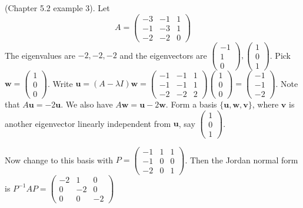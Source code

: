 \documentclass[a4paper]{article}
\begin{document}
      \begin{eg}
        (Chapter 5.2 example 3). Let
        \[
          A = \begin{pmatrix}
            -3 & -1 & 1\\
            -1 & -3 & 1\\
            -2 & -2 & 0
          \end{pmatrix}
        \]
        The eigenvalues are $-2, -2, -2$ and the eigenvectors are $
        \begin{pmatrix}
          -1 \\1 \\ 0
        \end{pmatrix}, 
        \begin{pmatrix}
          1 \\ 0 \\1
        \end{pmatrix}$. Pick $\mathbf{w} = 
        \begin{pmatrix}
          1\\0\\0
        \end{pmatrix}$. Write $\mathbf{u} = (A - \lambda I)\mathbf{w} = 
        \begin{pmatrix}
          -1 & -1 & 1\\
          -1 & -1 & 1\\
          -2 & -2 & 2
        \end{pmatrix}
        \begin{pmatrix}
          1\\0\\0
        \end{pmatrix} = 
        \begin{pmatrix}
          -1\\-1\\-2
        \end{pmatrix}$. Note that $A\mathbf{u} = -2\mathbf{u}$. We also have $A\mathbf{w} = \mathbf{u} - 2\mathbf{w}$. Form a basis $\{\mathbf{u}, \mathbf{w}, \mathbf{v}\}$, where $\mathbf{v}$ is another eigenvector linearly independent from $\mathbf{u}$, say $
        \begin{pmatrix}
          1\\0\\1
        \end{pmatrix}$.

        Now change to this basis with 
        $P = \begin{pmatrix}
          -1 & 1 & 1\\
          -1 & 0 & 0\\
          -2 & 0 & 1
        \end{pmatrix}$. Then the Jordan normal form is $P^{-1}AP = 
        \begin{pmatrix}
          -2 & 1 & 0\\
          0 & -2 & 0\\
          0 & 0 & -2
        \end{pmatrix}$
      \end{eg}
\end{document}

